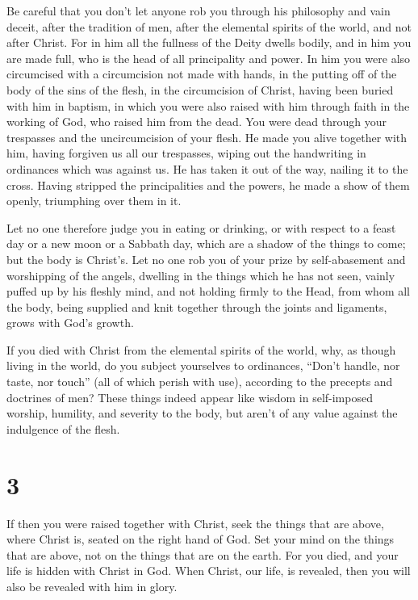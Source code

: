  Be careful that you don't let anyone rob you through his
philosophy and vain deceit, after the tradition of men, after the
elemental spirits of the world, and not after Christ.  For
in him all the fullness of the Deity dwells bodily,  and in
him you are made full, who is the head of all principality and power.
 In him you were also circumcised with a circumcision not
made with hands, in the putting off of the body of the sins of the
flesh, in the circumcision of Christ,  having been buried
with him in baptism, in which you were also raised with him through
faith in the working of God, who raised him from the dead. 
You were dead through your trespasses and the uncircumcision of your
flesh. He made you alive together with him, having forgiven us all our
trespasses,  wiping out the handwriting in ordinances which
was against us. He has taken it out of the way, nailing it to the cross.
 Having stripped the principalities and the powers, he made
a show of them openly, triumphing over them in it.

 Let no one therefore judge you in eating or drinking, or
with respect to a feast day or a new moon or a Sabbath day,
 which are a shadow of the things to come; but the body is
Christ's.  Let no one rob you of your prize by
self-abasement and worshipping of the angels, dwelling in the things
which he has not seen, vainly puffed up by his fleshly mind,
 and not holding firmly to the Head, from whom all the
body, being supplied and knit together through the joints and ligaments,
grows with God's growth.

 If you died with Christ from the elemental spirits of the
world, why, as though living in the world, do you subject yourselves to
ordinances,  ``Don't handle, nor taste, nor touch''
 (all of which perish with use), according to the precepts
and doctrines of men?  These things indeed appear like
wisdom in self-imposed worship, humility, and severity to the body, but
aren't of any value against the indulgence of the flesh.

\hypertarget{section-2}{%
\section{3}\label{section-2}}

 If then you were raised together with Christ, seek the
things that are above, where Christ is, seated on the right hand of God.
 Set your mind on the things that are above, not on the
things that are on the earth.  For you died, and your life
is hidden with Christ in God.  When Christ, our life, is
revealed, then you will also be revealed with him in glory.

